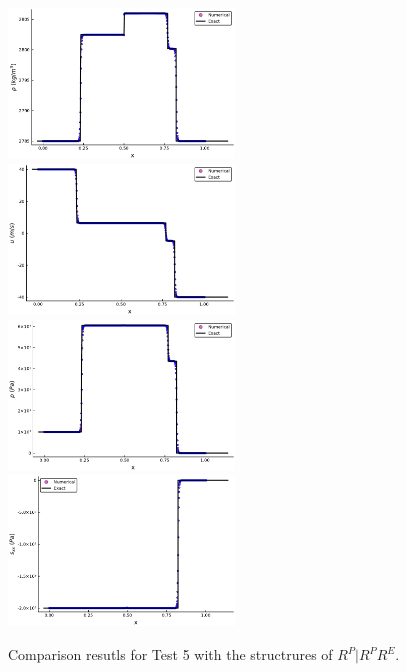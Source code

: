 \documentclass[review]{elsarticle}
\begin{document}
\begin{enumerate}[Step 1]
\begin{figure}
  \includegraphics[width= 6cm] {case5rho.pdf}
  \includegraphics[width= 6cm] {case5u.pdf}
  \includegraphics[width= 6cm] {case5p.pdf}
  \includegraphics[width= 6cm] {case5sxx.pdf}

    \caption{Comparison resutls for Test 5 with the structrures of $R^P|R^PR^E$.  }
  \label{fig:case5}
\end{figure}

\end{enumerate}
\end{document}
